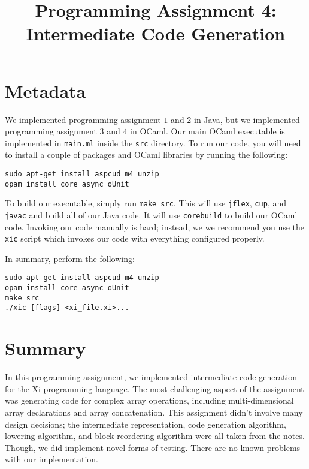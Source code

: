 \documentclass{hw}
\title{Programming Assignment 4:\\ Intermediate Code Generation}
\newcommand{\ir}{intermediate representation}
\begin{document}
\maketitle

\section{Metadata}\label{sec:metadata}
We implemented programming assignment $1$ and $2$ in Java, but we implemented
programming assignment $3$ and $4$ in OCaml. Our main OCaml executable is
implemented in \texttt{main.ml} inside the \texttt{src} directory. To run our
code, you will need to install a couple of packages and OCaml libraries by
running the following:

\begin{center}
\begin{BVerbatim}
sudo apt-get install aspcud m4 unzip
opam install core async oUnit
\end{BVerbatim}
\end{center}

To build our executable, simply run \texttt{make src}. This will use
\texttt{jflex}, \texttt{cup}, and \texttt{javac} and build all of our Java
code. It will use \texttt{corebuild} to build our OCaml code. Invoking our
code manually is hard; instead, we we recommend you use the \texttt{xic} script
which invokes our code with everything configured properly.

In summary, perform the following:

\begin{center}
\begin{BVerbatim}
sudo apt-get install aspcud m4 unzip
opam install core async oUnit
make src
./xic [flags] <xi_file.xi>...
\end{BVerbatim}
\end{center}

\section{Summary}\label{sec:summary}
In this programming assignment, we implemented intermediate code generation for
the Xi programming language. The most challenging aspect of the assignment was
generating code for complex array operations, including multi-dimensional array
declarations and array concatenation. This assignment didn't involve many
design decisions; the \ir, code generation algorithm, lowering algorithm, and
block reordering algorithm were all taken from the notes. Though, we did
implement novel forms of testing. There are no known problems with our
implementation.
\end{document}
